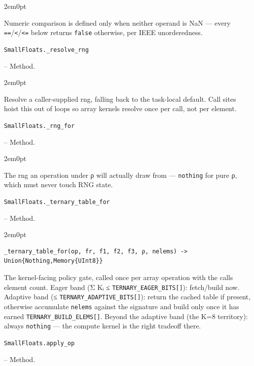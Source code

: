 \begin{adjustwidth}{2em}{0pt}

Numeric comparison is defined only when neither operand is NaN — every \texttt{==}/\texttt{<}/\texttt{<=} below returns \texttt{false} otherwise, per IEEE unorderedness.



\end{adjustwidth}
\hypertarget{7363307359868208211}{\texttt{SmallFloats.\_resolve\_rng}}  -- {Method.}

\begin{adjustwidth}{2em}{0pt}

Resolve a caller-supplied rng, falling back to the task-local default. Call sites hoist this out of loops so array kernels resolve once per call, not per element.



\end{adjustwidth}
\hypertarget{13712544213067904585}{\texttt{SmallFloats.\_rng\_for}}  -- {Method.}

\begin{adjustwidth}{2em}{0pt}

The rng an operation under ρ will actually draw from — \texttt{nothing} for pure ρ, which must never touch RNG state.



\end{adjustwidth}
\hypertarget{17911291590751857121}{\texttt{SmallFloats.\_ternary\_table\_for}}  -- {Method.}

\begin{adjustwidth}{2em}{0pt}


\begin{verbatim}
_ternary_table_for(op, fr, f1, f2, f3, ρ, nelems) -> Union{Nothing,Memory{UInt8}}
\end{verbatim}

The kernel-facing policy gate, called once per array operation with the call{\textquotesingle}s element count. Eager band (Σ Kᵢ ≤ \texttt{TERNARY\_EAGER\_BITS[]}): fetch/build now. Adaptive band (≤ \texttt{TERNARY\_ADAPTIVE\_BITS[]}): return the cached table if present, otherwise accumulate \texttt{nelems} against the signature and build only once it has earned \texttt{TERNARY\_BUILD\_ELEMS[]}. Beyond the adaptive band (the K=8 territory): always \texttt{nothing} — the compute kernel is the right tradeoff there.



\end{adjustwidth}
\hypertarget{8539869125382303808}{\texttt{SmallFloats.apply\_op}}  -- {Method.}

